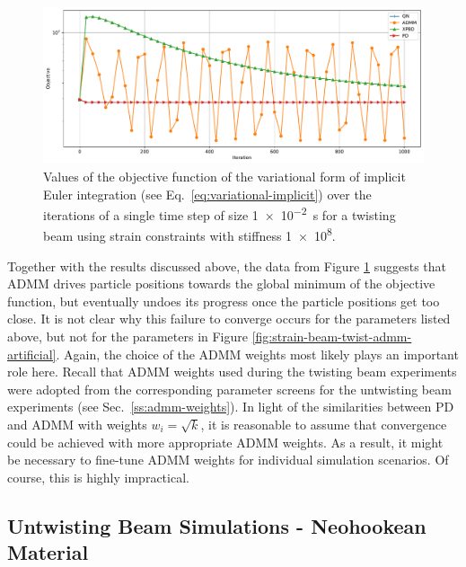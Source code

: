 \begin{figure}[h]
    \includegraphics[width=\textwidth]{figures/strain_beam_twist_objectives_admm_failure.pdf}
    \caption{Values of the objective function of the variational form of implicit Euler integration (see Eq.\ \ref{eq:variational-implicit}) over the iterations of 
        a single time step of size \SI{1e-2}{\second} for a twisting beam using strain constraints with stiffness \num{1e8}.}
    \label{fig:strain-beam-twist-objectives-admm-failure}
\end{figure}

Together with the results discussed above, the data from Figure \ref{fig:strain-beam-twist-objectives-admm-failure} suggests that ADMM drives particle 
positions towards the global minimum of the objective function, but eventually undoes its progress once the particle positions get too close. It is not clear why 
this failure to converge occurs for the parameters listed above, but not for the parameters in Figure \ref{fig:strain-beam-twist-admm-artificial}. Again, the choice 
of the ADMM weights most likely plays an important role here. Recall that ADMM weights used during the twisting beam experiments were adopted from the corresponding 
parameter screens for the untwisting beam experiments (see Sec.\ \ref{ss:admm-weights}). In light of the similarities between PD and ADMM with weights $w_i = \sqrt{k}$, 
it is reasonable to assume that convergence could be achieved with more appropriate ADMM weights. As a result, it might be necessary to fine-tune ADMM weights for 
individual simulation scenarios. Of course, this is highly impractical.

\subsection{Untwisting Beam Simulations - Neohookean Material}\label{ss:untwisting-beam-neohookean}


